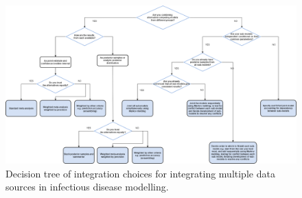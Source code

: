 \documentclass{article}
\begin{document}



\begin{figure}[htbp]
    \centering
    \includegraphics[width=\textwidth]{figures/integration choices decision tree.drawio (1).png}
    \caption{Decision tree of integration choices for integrating multiple data sources in infectious disease modelling.}
    \label{fig:integration}
\end{figure}
\end{document}
